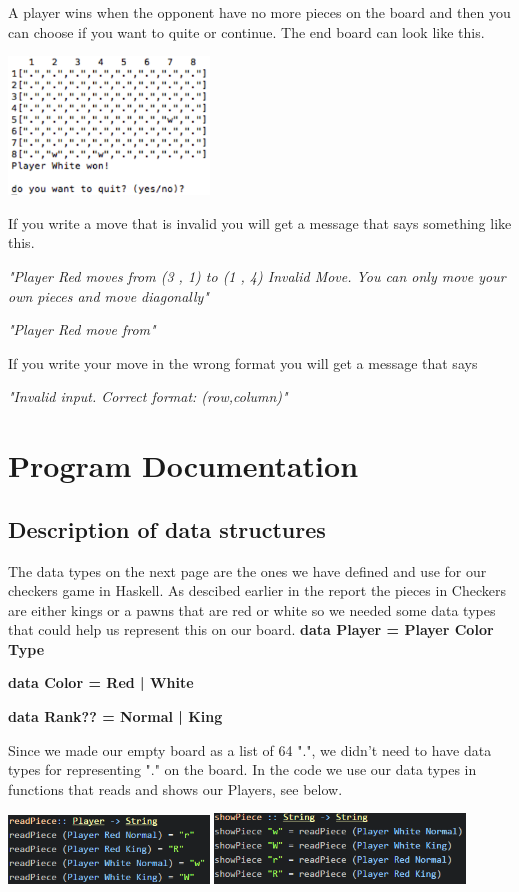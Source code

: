 \documentclass[12pt,a4paper]{article}
\begin{document}
A player wins when the opponent have no more pieces on the board and then you can choose if you want to quite or continue. The end board can look like this.

\begin{center}
	\includegraphics[width= 0.4\textwidth]{victory.PNG}
\end{center}

If you write a move that is invalid you will get a message that says something like this.

\textit{"Player Red moves from (3 , 1) to (1 , 4)
Invalid Move. You can only move your own pieces and move diagonally"}

\textit{"Player Red move from"}

If you write your move in the wrong format you will get a message that says 

\textit{"Invalid input. Correct format: (row,column)"}




\section{Program Documentation}
\subsection{Description of data structures}
The data types on the next page are the ones we have defined and use for our checkers game in Haskell. As descibed earlier in the report the pieces in Checkers are either kings or a pawns that are red or white so we needed some data types that could help us represent this on our board.
\newpage\textbf{data Player = Player Color Type}

\textbf{data Color = Red | White}

\textbf{data Rank?? = Normal | King}

Since we made our empty board as a list of 64 ".", we didn't need to have data types for representing "." on the board. In the code we use our data types in functions that reads and shows our Players, see below. 


\includegraphics[width= 0.4\textwidth]{read.PNG}  \includegraphics[width= 0.5\textwidth]{show.PNG}
\end{document}

